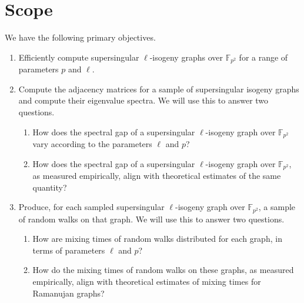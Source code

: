       \section{Scope}
        We have the following primary objectives. 
        \begin{enumerate}
            \item 
                Efficiently compute supersingular $\ell$-isogeny graphs over $\mathbb{F}_{p^2}$ for a range of parameters $p$ and $\ell$.
            \item 
                Compute the adjacency matrices for a sample of supersingular isogeny graphs and compute their eigenvalue spectra. We will use this to answer two questions.
                \begin{enumerate}
                    \item 
                        How does the spectral gap of a supersingular $\ell$-isogeny graph over $\mathbb{F}_{p^2}$ vary according to the parameters $\ell$ and $p$?
                    \item 
                        How does the spectral gap of a supersingular $\ell$-isogeny graph over $\mathbb{F}_{p^2}$, as measured empirically, align with theoretical estimates of the same quantity?
                \end{enumerate}
            \item 
                Produce, for each sampled supersingular $\ell$-isogeny graph over $\mathbb{F}_{p^2}$, a sample of random walks on that graph. We will use this to answer two questions.
                \begin{enumerate}
                    \item
                        How are mixing times of random walks distributed for each graph, in terms of parameters $\ell$ and $p$?
                    \item 
                        How do the mixing times of random walks on these graphs, as measured empirically, align with theoretical estimates of mixing times for Ramanujan graphs?
                \end{enumerate}
        \end{enumerate}

    
    